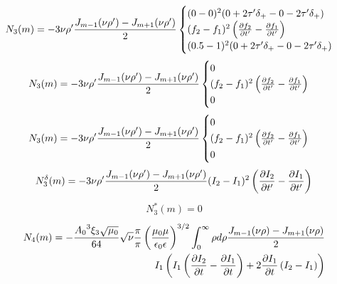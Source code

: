 %
\textcolor{lightgray} { \begin{equation*} \begin{aligned}
N_3 (m) = - 3 \nu \rho'
\frac{J_{m-1} (\nu \rho') - J_{m+1} (\nu \rho')}{2} \begin{cases}
(0-0)^2 (0 + 2 \tau' \delta_+ - 0 - 2 \tau' \delta_+) \\
(f_2 - f_1)^2 \left( \frac{\partial f_2}{\partial t'} - \frac{\partial f_1}{\partial t'} \right) \\
(0.5 - 1)^2 (0 + 2 \tau' \delta_+ - 0 - 2 \tau' \delta_+)
\end{cases} \end{aligned} \end{equation*} }
%
\textcolor{lightgray} { \begin{equation*} \begin{aligned}
N_3 (m) = - 3 \nu \rho'
\frac{J_{m-1} (\nu \rho') - J_{m+1} (\nu \rho')}{2} \begin{cases} 0 \\
(f_2 - f_1)^2 \left( \frac{\partial f_2}{\partial t'} - \frac{\partial f_1}{\partial t'} \right) \\ 0
\end{cases} \end{aligned} \end{equation*} }
%
\textcolor{lightgray} { \begin{equation*} \begin{aligned}
N_3 (m) = - 3 \nu \rho'
\frac{J_{m-1} (\nu \rho') - J_{m+1} (\nu \rho')}{2} \begin{cases} 0 \\
(f_2 - f_1)^2 \left( \frac{\partial f_2}{\partial t'} - \frac{\partial f_1}{\partial t'} \right) \\ 0
\end{cases} \end{aligned} \end{equation*} }
%
\begin{equation*} \begin{aligned}
N_3^\delta (m) = - 3 \nu \rho'
\frac{J_{m-1} (\nu \rho') - J_{m+1} (\nu \rho')}{2}
(I_2 - I_1)^2 \left( \frac{\partial I_2}{\partial t'} - \frac{\partial I_1}{\partial t'} \right)
\end{aligned} \end{equation*}
%
\begin{equation*} \begin{aligned}
N_3^* (m) = 0
\end{aligned} \end{equation*}
%
\textcolor{lightgray} { \begin{equation*} \begin{aligned}
N_4 (m) = - \frac{ {A_0}^3 \xi_3 \sqrt{\mu_0}}{64} \sqrt{\nu} \frac{\pi}{\pi}
\left( \frac{\mu_0 \mu} {\epsilon_0 \epsilon} \right)^{3/2}
\int_{0}^{\infty} \rho d \rho 
\frac{J_{m-1} (\nu \rho) - J_{m+1} (\nu \rho)}{2} \\
I_1 \left( I_1 \left( \frac{\partial I_2}{\partial t} - \frac{\partial I_1}{\partial t} \right) + 
2 \frac{\partial I_1}{\partial t} \left( I_2 - I_1 \right) \right)
\end{aligned} \end{equation*} }
